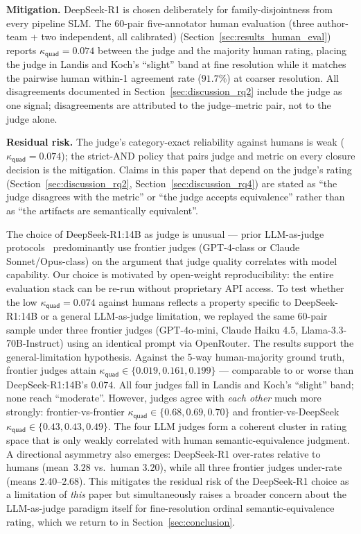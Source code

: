 \textbf{Mitigation.} DeepSeek-R1 is chosen deliberately for family-disjointness from every pipeline SLM. The 60-pair five-annotator human evaluation (three author-team + two independent, all calibrated) (Section~\ref{sec:results_human_eval}) reports $\kappa_{\textsf{quad}} = 0.074$ between the judge and the majority human rating, placing the judge in Landis and Koch's ``slight'' band at fine resolution while it matches the pairwise human within-1 agreement rate ($91.7\%$) at coarser resolution. All disagreements documented in Section~\ref{sec:discussion_rq2} include the judge as one signal; disagreements are attributed to the judge--metric pair, not to the judge alone.

\textbf{Residual risk.} The judge's category-exact reliability against humans is weak ($\kappa_{\textsf{quad}} = 0.074$); the strict-AND policy that pairs judge and metric on every closure decision is the mitigation. Claims in this paper that depend on the judge's rating (Section~\ref{sec:discussion_rq2}, Section~\ref{sec:discussion_rq4}) are stated as ``the judge disagrees with the metric'' or ``the judge accepts equivalence'' rather than as ``the artifacts are semantically equivalent''.

The choice of DeepSeek-R1:14B as judge is unusual --- prior LLM-as-judge protocols~\citep[e.g.,][and successors]{Zheng2023LLMJudge} predominantly use frontier judges (GPT-4-class or Claude Sonnet/Opus-class) on the argument that judge quality correlates with model capability. Our choice is motivated by open-weight reproducibility: the entire evaluation stack can be re-run without proprietary API access. To test whether the low $\kappa_{\textsf{quad}} = 0.074$ against humans reflects a property specific to DeepSeek-R1:14B or a general LLM-as-judge limitation, we replayed the same 60-pair sample under three frontier judges (GPT-4o-mini, Claude Haiku 4.5, Llama-3.3-70B-Instruct) using an identical prompt via OpenRouter. The results support the general-limitation hypothesis. Against the 5-way human-majority ground truth, frontier judges attain $\kappa_{\textsf{quad}} \in \{0.019, 0.161, 0.199\}$ --- comparable to or worse than DeepSeek-R1:14B's $0.074$. All four judges fall in Landis and Koch's ``slight'' band; none reach ``moderate''. However, judges agree with \emph{each other} much more strongly: frontier-vs-frontier $\kappa_{\textsf{quad}} \in \{0.68, 0.69, 0.70\}$ and frontier-vs-DeepSeek $\kappa_{\textsf{quad}} \in \{0.43, 0.43, 0.49\}$. The four LLM judges form a coherent cluster in rating space that is only weakly correlated with human semantic-equivalence judgment. A directional asymmetry also emerges: DeepSeek-R1 over-rates relative to humans (mean~$3.28$ vs.\ human $3.20$), while all three frontier judges under-rate (means $2.40$--$2.68$). This mitigates the residual risk of the DeepSeek-R1 choice as a limitation of \emph{this} paper but simultaneously raises a broader concern about the LLM-as-judge paradigm itself for fine-resolution ordinal semantic-equivalence rating, which we return to in Section~\ref{sec:conclusion}.

